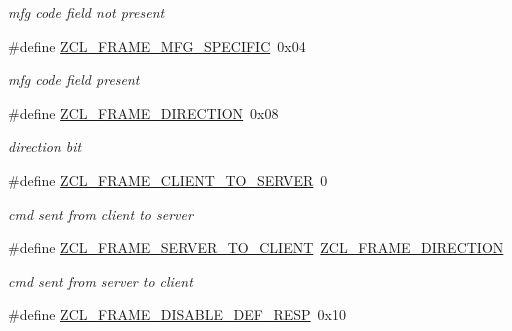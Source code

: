 \begin{DoxyCompactItemize}
\begin{DoxyCompactList}\small\item\em mfg code field not present \end{DoxyCompactList}\item 
\hypertarget{group__zcl_ga48ffbdfe840975527d8e9e6d86c12dae}{\#define \hyperlink{group__zcl_ga48ffbdfe840975527d8e9e6d86c12dae}{Z\-C\-L\-\_\-\-F\-R\-A\-M\-E\-\_\-\-M\-F\-G\-\_\-\-S\-P\-E\-C\-I\-F\-I\-C}~0x04}\label{group__zcl_ga48ffbdfe840975527d8e9e6d86c12dae}

\begin{DoxyCompactList}\small\item\em mfg code field present \end{DoxyCompactList}\item 
\hypertarget{group__zcl_ga38975849d925ebb3643cb9f5d62b68fe}{\#define \hyperlink{group__zcl_ga38975849d925ebb3643cb9f5d62b68fe}{Z\-C\-L\-\_\-\-F\-R\-A\-M\-E\-\_\-\-D\-I\-R\-E\-C\-T\-I\-O\-N}~0x08}\label{group__zcl_ga38975849d925ebb3643cb9f5d62b68fe}

\begin{DoxyCompactList}\small\item\em direction bit \end{DoxyCompactList}\item 
\hypertarget{group__zcl_ga245f966df7431d5b9268bbf227770173}{\#define \hyperlink{group__zcl_ga245f966df7431d5b9268bbf227770173}{Z\-C\-L\-\_\-\-F\-R\-A\-M\-E\-\_\-\-C\-L\-I\-E\-N\-T\-\_\-\-T\-O\-\_\-\-S\-E\-R\-V\-E\-R}~0}\label{group__zcl_ga245f966df7431d5b9268bbf227770173}

\begin{DoxyCompactList}\small\item\em cmd sent from client to server \end{DoxyCompactList}\item 
\hypertarget{group__zcl_gac173779e7c48817dbd79042d7a189524}{\#define \hyperlink{group__zcl_gac173779e7c48817dbd79042d7a189524}{Z\-C\-L\-\_\-\-F\-R\-A\-M\-E\-\_\-\-S\-E\-R\-V\-E\-R\-\_\-\-T\-O\-\_\-\-C\-L\-I\-E\-N\-T}~\hyperlink{group__zcl_ga38975849d925ebb3643cb9f5d62b68fe}{Z\-C\-L\-\_\-\-F\-R\-A\-M\-E\-\_\-\-D\-I\-R\-E\-C\-T\-I\-O\-N}}\label{group__zcl_gac173779e7c48817dbd79042d7a189524}

\begin{DoxyCompactList}\small\item\em cmd sent from server to client \end{DoxyCompactList}\item 
\hypertarget{group__zcl_ga080b9f73f48767fc6af9b5da27d30d70}{\#define \hyperlink{group__zcl_ga080b9f73f48767fc6af9b5da27d30d70}{Z\-C\-L\-\_\-\-F\-R\-A\-M\-E\-\_\-\-D\-I\-S\-A\-B\-L\-E\-\_\-\-D\-E\-F\-\_\-\-R\-E\-S\-P}~0x10}\label{group__zcl_ga080b9f73f48767fc6af9b5da27d30d70}


\end{DoxyCompactItemize}
